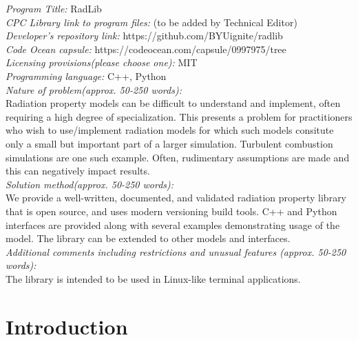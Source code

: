 \documentclass[preprint,12pt]{elsarticle}
\begin{document}
\begin{small}
\noindent
{\em Program Title:} RadLib                                         \\
{\em CPC Library link to program files:} (to be added by Technical Editor) \\
{\em Developer's repository link:} https://github.com/BYUignite/radlib \\
{\em Code Ocean capsule:} https://codeocean.com/capsule/0997975/tree \\
{\em Licensing provisions(please choose one):} MIT \\
{\em Programming language:} C++, Python                                   \\
{\em Nature of problem(approx. 50-250 words):} \\
Radiation property models can be difficult to understand and implement, often requiring a high degree of specialization. This presents a problem for practitioners who wish to use/implement radiation models for which such models consitute only a small but important part of a larger simulation. Turbulent combustion simulations are one such example. Often, rudimentary assumptions are made and this can negatively impact results. \\
{\em Solution method(approx. 50-250 words):}\\
We provide a well-written, documented, and validated radiation property library that is open source, and uses modern versioning build tools. C++ and Python interfaces are provided along with several examples demonstrating usage of the model. The library can be extended to other models and interfaces. \\ 
{\em Additional comments including restrictions and unusual features (approx. 50-250 words):}\\
The library is intended to be used in Linux-like terminal applications.  
   \\

\end{small}


\section{Introduction} \label{s:motivation}
\end{document}
